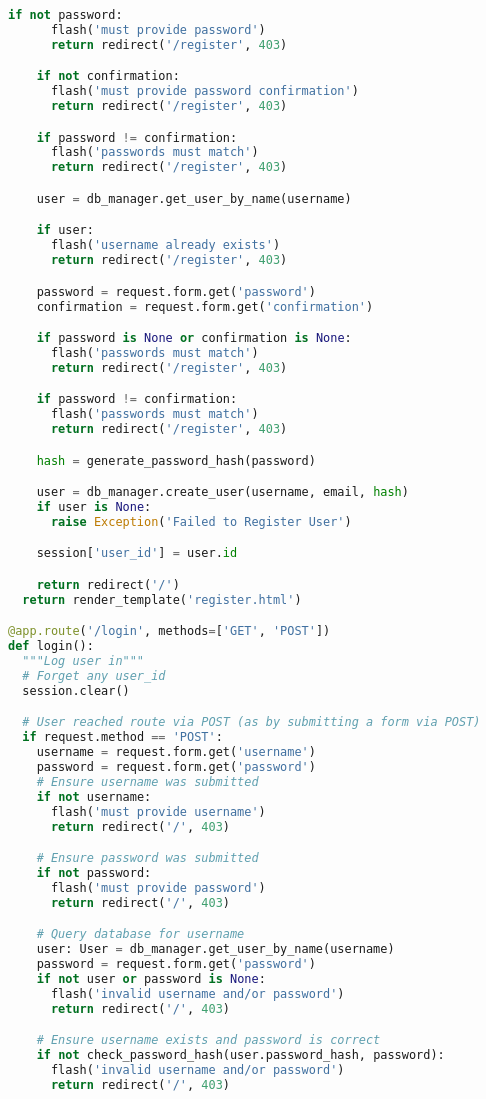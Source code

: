 \begin{lstlisting}[language=Python]
    if not password:
      flash('must provide password')
      return redirect('/register', 403)

    if not confirmation:
      flash('must provide password confirmation')
      return redirect('/register', 403)

    if password != confirmation:
      flash('passwords must match')
      return redirect('/register', 403)

    user = db_manager.get_user_by_name(username)

    if user:
      flash('username already exists')
      return redirect('/register', 403)

    password = request.form.get('password')
    confirmation = request.form.get('confirmation')

    if password is None or confirmation is None:
      flash('passwords must match')
      return redirect('/register', 403)

    if password != confirmation:
      flash('passwords must match')
      return redirect('/register', 403)

    hash = generate_password_hash(password)

    user = db_manager.create_user(username, email, hash)
    if user is None:
      raise Exception('Failed to Register User')

    session['user_id'] = user.id

    return redirect('/')
  return render_template('register.html')

@app.route('/login', methods=['GET', 'POST'])
def login():
  """Log user in"""
  # Forget any user_id
  session.clear()

  # User reached route via POST (as by submitting a form via POST)
  if request.method == 'POST':
    username = request.form.get('username')
    password = request.form.get('password')
    # Ensure username was submitted
    if not username:
      flash('must provide username')
      return redirect('/', 403)

    # Ensure password was submitted
    if not password:
      flash('must provide password')
      return redirect('/', 403)

    # Query database for username
    user: User = db_manager.get_user_by_name(username)
    password = request.form.get('password')
    if not user or password is None:
      flash('invalid username and/or password')
      return redirect('/', 403)

    # Ensure username exists and password is correct
    if not check_password_hash(user.password_hash, password):
      flash('invalid username and/or password')
      return redirect('/', 403)


\end{lstlisting}
